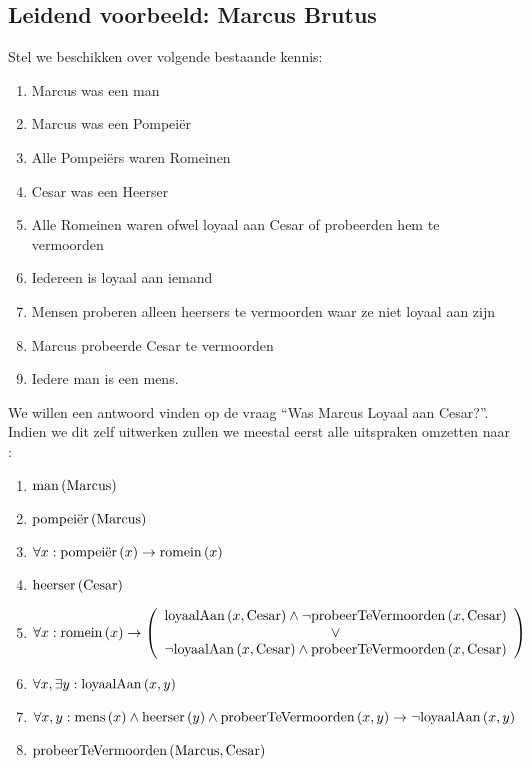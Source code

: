 \subsection{Leidend voorbeeld: Marcus Brutus}
\begin{leftbar}
Stel we beschikken over volgende bestaande kennis:
\begin{enumerate}
 \item Marcus was een man
 \item Marcus was een Pompei\"er
 \item Alle Pompei\"ers waren Romeinen
 \item Cesar was een Heerser
 \item Alle Romeinen waren ofwel loyaal aan Cesar of probeerden hem te vermoorden
 \item Iedereen is loyaal aan iemand
 \item Mensen proberen alleen heersers te vermoorden waar ze niet loyaal aan zijn
 \item Marcus probeerde Cesar te vermoorden
 \item Iedere man is een mens.
\end{enumerate}
We willen een antwoord vinden op de vraag ``Was Marcus  Loyaal aan Cesar?''. Indien we dit zelf uitwerken zullen we meestal eerst alle uitspraken omzetten naar :
\begin{enumerate}
 \item $\mbox{man}\left( \mbox{Marcus} \right)$
 \item $\mbox{pompei\"er}\left( \mbox{Marcus} \right)$
 \item $\forall x:\mbox{pompei\"er}\left( x \right)\rightarrow\mbox{romein}\left( x \right)$
 \item $\mbox{heerser}\left( \mbox{Cesar} \right)$
\item $\forall x:\mbox{romein}\left( x \right)\rightarrow\left(\begin{array}{c}\mbox{loyaalAan}\left( x,\mbox{Cesar} \right)\wedge\neg\mbox{probeerTeVermoorden}\left( x,\mbox{Cesar} \right)\\\vee\\\neg\mbox{loyaalAan}\left( x,\mbox{Cesar} \right)\wedge\mbox{probeerTeVermoorden}\left( x,\mbox{Cesar} \right)\end{array}\right)$
 \item $\forall x, \exists y:\mbox{loyaalAan}\left( x,y \right)$
 \item $\forall x,y:\mbox{mens}\left( x \right)\wedge\mbox{heerser}\left( y \right)\wedge\mbox{probeerTeVermoorden}\left( x,y \right)\rightarrow\neg\mbox{loyaalAan}\left( x,y \right)$
 \item $\mbox{probeerTeVermoorden}\left( \mbox{Marcus},\mbox{Cesar} \right)$

\end{enumerate}
\end{leftbar}
